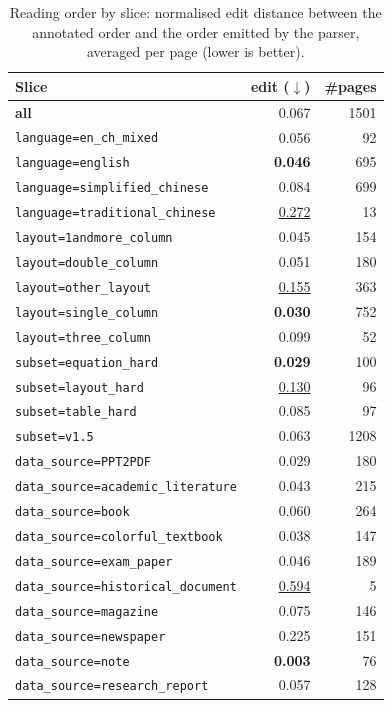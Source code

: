 \begin{table}[H]
\centering
\caption{Reading order by slice: normalised edit distance between the annotated
order and the order emitted by the parser, averaged per page (lower is better).}
\label{tab:app-res-ro}
\scriptsize
\begin{tabular}{@{}l r r@{}}
\toprule
Slice & edit ($\downarrow$) & \#pages \\
\midrule
    \textbf{all} & 0.067 & 1501 \\ \midrule
    \texttt{language=en\_ch\_mixed} & 0.056 & 92 \\
    \texttt{language=english} & \textbf{0.046} & 695 \\
    \texttt{language=simplified\_chinese} & 0.084 & 699 \\
    \texttt{language=traditional\_chinese} & \underline{0.272} & 13 \\
    \midrule
    \texttt{layout=1andmore\_column} & 0.045 & 154 \\
    \texttt{layout=double\_column} & 0.051 & 180 \\
    \texttt{layout=other\_layout} & \underline{0.155} & 363 \\
    \texttt{layout=single\_column} & \textbf{0.030} & 752 \\
    \texttt{layout=three\_column} & 0.099 & 52 \\
    \midrule
    \texttt{subset=equation\_hard} & \textbf{0.029} & 100 \\
    \texttt{subset=layout\_hard} & \underline{0.130} & 96 \\
    \texttt{subset=table\_hard} & 0.085 & 97 \\
    \texttt{subset=v1.5} & 0.063 & 1208 \\
    \midrule
    \texttt{data\_source=PPT2PDF} & 0.029 & 180 \\
    \texttt{data\_source=academic\_literature} & 0.043 & 215 \\
    \texttt{data\_source=book} & 0.060 & 264 \\
    \texttt{data\_source=colorful\_textbook} & 0.038 & 147 \\
    \texttt{data\_source=exam\_paper} & 0.046 & 189 \\
    \texttt{data\_source=historical\_document} & \underline{0.594} & 5 \\
    \texttt{data\_source=magazine} & 0.075 & 146 \\
    \texttt{data\_source=newspaper} & 0.225 & 151 \\
    \texttt{data\_source=note} & \textbf{0.003} & 76 \\
    \texttt{data\_source=research\_report} & 0.057 & 128 \\
\bottomrule
\end{tabular}
\end{table}

